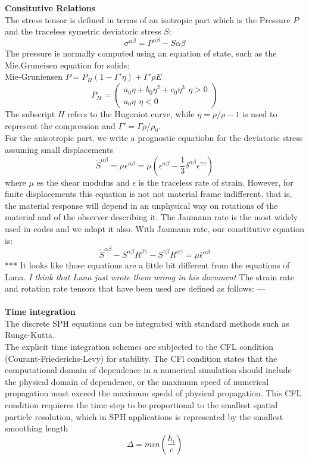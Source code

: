 \documentclass[12pt]{book}
\begin{document}
\textbf{Consitutive Relations}\\
The stress tensor is defined in terms of an isotropic part which is the Pressure $P$ and the traceless symetric deviatoric stress $S$:
\[\sigma^{\alpha\beta} = P^{\alpha\beta}-S{\alpha\beta}\]
The pressure is normally computed using an equation of state, such as the Mie.Gruneisen equation for solids:\\
Mie-Gruniensen $P=P_H(1-\Gamma'\eta)+\Gamma'\rho E$
\[P_H=\left(\begin{array}{c}
 a_0\eta+b_0\eta^2+c_0\eta^3 \,\ \eta>0\\
 a_0\eta \,\ \eta<0
\end{array}\right)\]
The subscript $H$ refers to the Hugoniot curve, while $\eta=\rho/\rho-1$ is used to represent the compression and $\Gamma'=\Gamma\rho/\rho_0$.\\
For the anisotropic part, we write a prognostic equatiobn for the deviatoric stress assuming small displacements
\[\dot{S}^{\alpha\beta}=\mu\epsilon^{\alpha\beta} = \mu\left(\epsilon^{\alpha\beta}-\frac{1}{3}\delta^{\alpha\beta}\epsilon^{\gamma\gamma}\right)\]
where $\mu$ es the shear modulus and $\epsilon$ is the traceless rate of strain.  However, for finite displacements this equation is not not material frame indifferent, that is, the material response will depend in an unphysical way on rotations of the material and of the observer describing it. The Jaumann rate is the most widely used in codes and we adopt it also. With Jaumann rate, our constitutive equation is:
\[\dot{S}^{\alpha\beta} - S^{\alpha\beta}R^{\beta\gamma} - S^{\gamma\beta}R^{\alpha\gamma} = \mu\bar{\epsilon}^{\alpha\beta}\]
*** It looks like those equations are a little bit different from the equations of Luna. \textit{I think that Luna just wrote them wrong in his document}
The strain rate and rotation rate tensors that have been used are defined as follows:
---
\\\\
\textbf{Time integration}\\
The discrete SPH equations can be integrated with standard methods such as Runge-Kutta.\\
The explicit time integration schemes are subjected to the CFL condition (Courant-Friederichs-Levy) for stability. The CFl condition states that the computational domain of dependence in a numerical simulation should include the physical domain of dependence, or the maximum speed of numerical propagation must exceed the maximum spedd of physical propagation. This CFL condition requieres the time step to be proportional to the smallest spatial particle resolution, which in SPH applications is represented by the smallest smoothing length
\[\Delta=min\left(\frac{h_i}{c}\right)\]
\end{document}
